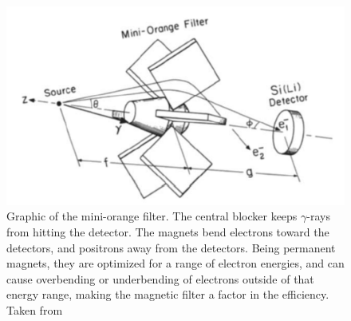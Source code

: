 \begin{figure}
    \centering
    \includegraphics[scale=0.6]{Setup_Figs/mini-orange-metlay-figure.pdf}
    \caption{Graphic of the mini-orange filter. The central blocker keeps $\gamma$-rays from hitting the detector. The magnets bend electrons toward the detectors, and positrons away from the detectors. Being permanent magnets, they are optimized for a range of electron energies, and can cause overbending or underbending of electrons outside of that energy range, making the magnetic filter a factor in the efficiency. Taken from \citep{metlay93:_iceball_comm}}
    \label{fig:mini_orange}
\end{figure}